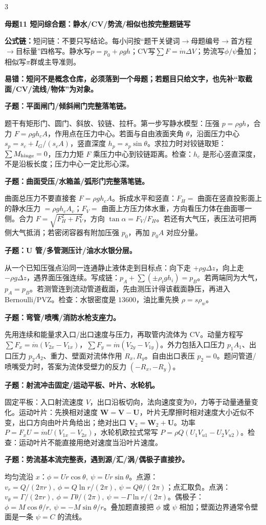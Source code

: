 \documentclass[a4paper]{article}
\newcommand{\mt}[1]{\vspace{0.12pt}\colorbox{M}{\parbox{\dimexpr\linewidth-2\fboxsep}{\color{white}\bfseries #1}}\par}
\newcommand{\qt}[1]{\vspace{0.04pt}\colorbox{Q}{\parbox{\dimexpr\linewidth-2\fboxsep}{\color{white}\bfseries #1}}\par}
\newcommand{\ans}[1]{\colorbox{G}{\parbox{\dimexpr\linewidth-2\fboxsep}{#1}}\par}
\newcommand{\warn}[1]{\colorbox{Y}{\parbox{\dimexpr\linewidth-2\fboxsep}{\color{E}\bfseries #1}}\par}
\newcommand{\form}[1]{{\color{M}\bfseries 公式链：}#1\par}
\begin{document}
\begin{multicols}{3}
\mt{母题11 短问综合题：静水/CV/势流/相似也按完整题链写}
\form{短问链：不要只写结论。每小问按“题干关键词$\to$母题编号$\to$首方程$\to$目标量”四格写。静水写$p=p_0+\rho gh$；CV写$\sum F=\dot m\Delta V$；势流写$\phi/\psi$叠加；相似写$\pi$群或主导准则。}
\warn{易错：短问不是概念仓库，必须落到一个母题；若题目只给文字，也先补“取截面/CV/流线/物体”为对象。}
\qt{子题：平面闸门/倾斜闸门完整落笔链。}
\ans{题干有矩形门、圆门、斜放、铰链、拉杆。第一步写静水模型：压强 $p=\rho gh$，合力 $F=\rho gh_cA$，作用点在压力中心。若面与自由液面夹角 $\theta$，沿面压力中心 $s_p=s_c+I_G/(s_cA)$，竖直深度 $h_p=s_p\sin\theta$。求拉力时对铰链取矩：$\sum M_{\rm hinge}=0$，压力力矩 $F$ 乘压力中心到铰链距离。检查：$h_c$ 是形心竖直深度，不是沿板长度；压力中心一定比形心深。}
\qt{子题：曲面受压/水箱盖/弧形门完整落笔链。}
\ans{曲面总压力不要直接套 $F=\rho gh_cA$。拆成水平和竖直：$F_H=$ 曲面在竖直投影面上的静水压力 $=\rho gh_cA_v$；$F_V=$ 曲面上方压力体水重，方向看压力体在曲面哪一侧。合力 $F=\sqrt{F_H^2+F_V^2}$，方向 $\tan\alpha=F_V/F_H$。若还有大气压，表压法可把两侧大气抵消；若密闭容器有附加压强 $p_0$，再加 $p_0A$ 对应分量。}
\qt{子题：U 管/多管测压计/油水水银分层。}
\ans{从一个已知压强点沿同一连通静止液体走到目标点：向下走 $+\rho g\Delta z$，向上走 $-\rho g\Delta z$，遇界面压强连续。写成链：$p_A+\sum(\pm\rho_i g h_i)=p_B$。若两端同为大气，$p_A=p_B$。若测管连到流动管道截面，先由测压计得该截面静压，再进入 Bernoulli/PVZ。检查：水银密度是 $13600$，油比重先换 $\rho=s\rho_w$。}
\qt{子题：弯管/喷嘴/消防水枪支座力。}
\ans{先用连续和能量求入口/出口速度与压力，再取管内流体为 CV。动量方程写 $\sum F_x=\dot m(V_{2x}-V_{1x})$，$\sum F_y=\dot m(V_{2y}-V_{1y})$。外力包括入口压力 $p_1A_1$、出口压力 $p_2A_2$、重力、壁面对流体作用 $R_x,R_y$。自由出口表压 $p_2=0$。题问管道/喷嘴受力时，答案为流体受壁力的反力 $(-R_x,-R_y)$。}
\qt{子题：射流冲击固定/运动平板、叶片、水轮机。}
\ans{固定平板：入口射流速度 $V$，出口沿板切向，法向速度变为0，力等于动量通量变化。运动叶片：先换相对速度 $\bm W=\bm V-\bm U$，叶片无摩擦时相对速度大小近似不变，出口方向由叶片角给出；绝对出口 $\bm V_2=\bm W_2+\bm U$。功率 $P=F_xU=\dot m U(V_{1x}-V_{2x})$，水轮机欧拉式常写 $P=\rho Q(U_1V_{u1}-U_2V_{u2})$。检查：运动叶片不能直接用绝对速度当沿叶片速度。}
\qt{子题：势流基本流完整表，遇到源/汇/涡/偶极子直接抄。}
\ans{均匀流沿 $x$：$\phi=Ur\cos\theta,\ \psi=Ur\sin\theta$。点源：$v_r=Q/(2\pi r),\ \phi=Q\ln r/(2\pi),\ \psi=Q\theta/(2\pi)$；点汇取负。点涡：$v_\theta=\Gamma/(2\pi r),\ \phi=\Gamma\theta/(2\pi),\ \psi=-\Gamma\ln r/(2\pi)$。偶极子：$\phi=M\cos\theta/r,\ \psi=-M\sin\theta/r$。叠加题直接把 $\phi$ 或 $\psi$ 相加；壁面边界通常令壁面是一条 $\psi=C$ 的流线。}

\end{multicols}
\end{document}
